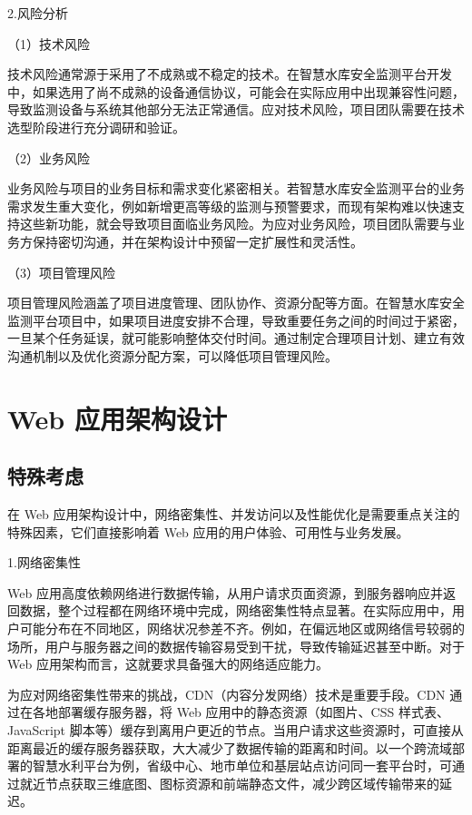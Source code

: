 2.风险分析

（1）技术风险

技术风险通常源于采用了不成熟或不稳定的技术。在智慧水库安全监测平台开发中，如果选用了尚不成熟的设备通信协议，可能会在实际应用中出现兼容性问题，导致监测设备与系统其他部分无法正常通信。应对技术风险，项目团队需要在技术选型阶段进行充分调研和验证。

（2）业务风险

业务风险与项目的业务目标和需求变化紧密相关。若智慧水库安全监测平台的业务需求发生重大变化，例如新增更高等级的监测与预警要求，而现有架构难以快速支持这些新功能，就会导致项目面临业务风险。为应对业务风险，项目团队需要与业务方保持密切沟通，并在架构设计中预留一定扩展性和灵活性。

（3）项目管理风险

项目管理风险涵盖了项目进度管理、团队协作、资源分配等方面。在智慧水库安全监测平台项目中，如果项目进度安排不合理，导致重要任务之间的时间过于紧密，一旦某个任务延误，就可能影响整体交付时间。通过制定合理项目计划、建立有效沟通机制以及优化资源分配方案，可以降低项目管理风险。

\section{Web 应用架构设计}

\subsection{特殊考虑}

在 Web 应用架构设计中，网络密集性、并发访问以及性能优化是需要重点关注的特殊因素，它们直接影响着 Web 应用的用户体验、可用性与业务发展。

1.网络密集性

Web 应用高度依赖网络进行数据传输，从用户请求页面资源，到服务器响应并返回数据，整个过程都在网络环境中完成，网络密集性特点显著。在实际应用中，用户可能分布在不同地区，网络状况参差不齐。例如，在偏远地区或网络信号较弱的场所，用户与服务器之间的数据传输容易受到干扰，导致传输延迟甚至中断。对于 Web 应用架构而言，这就要求具备强大的网络适应能力。

为应对网络密集性带来的挑战，CDN（内容分发网络）技术是重要手段。CDN 通过在各地部署缓存服务器，将 Web 应用中的静态资源（如图片、CSS 样式表、JavaScript 脚本等）缓存到离用户更近的节点。当用户请求这些资源时，可直接从距离最近的缓存服务器获取，大大减少了数据传输的距离和时间。以一个跨流域部署的智慧水利平台为例，省级中心、地市单位和基层站点访问同一套平台时，可通过就近节点获取三维底图、图标资源和前端静态文件，减少跨区域传输带来的延迟。

